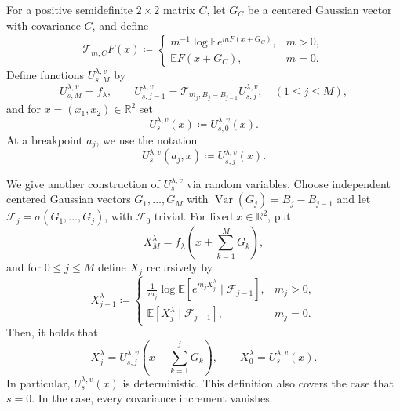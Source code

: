 \documentclass[11pt]{article}
\numberwithin{equation}{section}
\newcommand{\E}{\mathbb{E}}
\newcommand{\1}{\mathbf 1}
\newcommand{\Var}{\operatorname{Var}}
\begin{document}
For a positive semidefinite $2\times2$ matrix $C$, let $G_C$ be a
centered Gaussian vector with covariance $C$, and define
\begin{equation}
 \mathcal T_{m,C}F(x)\coloneqq
 \begin{cases}
 m^{-1}\log\E e^{mF(x+G_C)},&m>0,\\[2mm]
 \E F(x+G_C),&m=0.
 \end{cases}
 \label{eq:GTsemigroup}
\end{equation}
Define functions $U_{s,M}^{\lambda,v}$ by
\begin{equation}
 U_{s,M}^{\lambda,v}=f_\lambda,
 \qquad
 U_{s,j-1}^{\lambda,v}
 =\mathcal T_{m_j,B_j-B_{j-1}}U_{s,j}^{\lambda,v},
 \quad ( 1\le j \le M),
 \label{eq:U-stage-recursion}
\end{equation}
and for $x=(x_1,x_2) \in {\mathbb R}^2$ set
\begin{equation}
 U_s^{\lambda,v}(x)\coloneqq U_{s,0}^{\lambda,v}(x).
\end{equation}
At a breakpoint $a_j$, we use the notation
\begin{equation}\label{eq:U@a}
 U_s^{\lambda,v}(a_j,x)\coloneqq U_{s,j}^{\lambda,v}(x).
\end{equation}

We give another construction of $U_s^{\lambda,v}$ via random variables.
Choose independent centered Gaussian vectors
$G_1,\ldots,G_M$ with $\Var(G_j)=B_j-B_{j-1}$ and let
$\mathcal F_j=\sigma(G_1,\ldots,G_j)$, with $\mathcal F_0$ trivial.
For fixed $x\in\mathbb R^2$, put
\[
 X_M^\lambda=f_\lambda\left(x+\sum_{k=1}^MG_k\right) ,
\]
and for $0\le j \le M$ define $X_j$ recursively by
\begin{equation}
 X_{j-1}^\lambda \coloneqq
 \begin{cases}
 \displaystyle\frac1{m_j}\log\E\left[
 e^{m_jX_j^\lambda}\mid\mathcal F_{j-1}\right],&m_j>0,\\[3mm]
 \displaystyle\E\left[X_j^\lambda\mid\mathcal F_{j-1}\right],&m_j=0.
 \end{cases}
 \label{eq:U-conditional-recursion}
\end{equation}
Then, it holds that
\begin{equation}\label{eq:relationXU}
 X_j^\lambda=U_{s,j}^{\lambda,v}
 \left(x+\sum_{k=1}^jG_k\right),
 \qquad
 X_0^\lambda = U_s^{\lambda,v}(x).
\end{equation}
In particular, $U_s^{\lambda,v}(x)$ is deterministic.  This definition
also covers the case that $s=0$.
In the case, every covariance increment vanishes.
\end{document}
